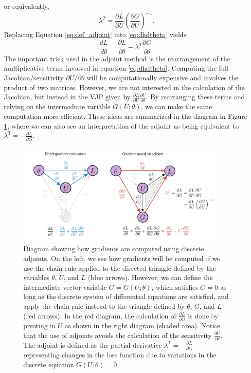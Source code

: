 or equivalently,
\begin{equation}
    \lambda^T = \frac{\partial L}{\partial U} \left( \frac{\partial G}{\partial U} \right)^{-1}.
    \label{eq:def_adjoint}
\end{equation}
Replacing Equation \eqref{eq:def_adjoint} into \eqref{eq:dhdtheta} yields
\begin{equation}
    \frac{dL}{d\theta} 
    =
    \frac{\partial L}{\partial \theta} 
    - 
    \lambda^T \frac{\partial G}{\partial \theta}.
    \label{eq:gradient-adjoint-state-method}
\end{equation}
The important trick used in the adjoint method is the rearrangement of the multiplicative terms involved in equation \eqref{eq:dhdtheta}. 
Computing the full Jacobian/sensitivity $\partial U / \partial \theta$ will be computationally expensive and involves the product of two matrices. 
However, we are not interested in the calculation of the Jacobian, but instead in the VJP given by $\frac{\partial L}{\partial U} \frac{\partial U}{\partial \theta}$. 
By rearranging these terms and relying on the intermediate variable $G(U; \theta)$, we can make the same computation more efficient. 
These ideas are summarized in the diagram in Figure \ref{fig:discrete-adjoint}, where we can also see an interpretation of the adjoint as being equivalent to $\lambda^T = - \frac{\partial L}{\partial G}$. 

\begin{figure}[t]
    \centering
    \includegraphics[width=0.95\textwidth]{figures/discrete_adjoint.pdf}
    \caption{Diagram showing how gradients are computed using discrete adjoints. On the left, we see how gradients will be computed if we use the chain rule applied to the directed triangle defined by the variables $\theta$, $U$, and $L$ (blue arrows). However, we can define the intermediate vector variable $G = G(U; \theta)$, which satisfies $G  = 0$ as long as the discrete system of differential equations are satisfied, and apply the chain rule instead to the triangle defined by $\theta$, $G$, and $L$ (red arrows). In the red diagram, the calculation of $\frac{\partial L}{\partial G}$ is done by pivoting in $U$ as shown in the right diagram (shaded area). Notice that the use of adjoints avoids the calculation of the sensitivity $\frac{\partial U}{\partial \theta}$. The adjoint is defined as the partial derivative $\lambda^T = - \frac{\partial L}{\partial G}$ representing changes in the loss function due to variations in the discrete equation $G(U; \theta) = 0$. 
    }
    \label{fig:discrete-adjoint}
\end{figure}

